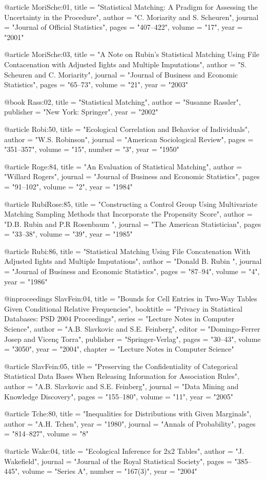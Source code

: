 @article{ MoriSche:01,
	title = "Statistical Matching: A Pradigm for Assessing the Uncertainty in the Procedure",
	author = "C. Moriarity and S. Scheuren",
	journal = "Journal of Official Statistics",
	pages = "407--422",
	volume = "17",
	year = "2001"
}

@article{ MoriSche:03,
	title = "A Note on Rubin’s Statistical Matching Using File Contacenation with Adjusted Iights and Multiple Imputations",
	author = "S. Scheuren and C. Moriarity",
	journal = "Journal of Business and Economic Statistics",
	pages = "65--73",
	volume = "21",
	year = "2003"
}

@book{ Rass:02,
	title = "Statistical Matching",
	author = "Susanne Rassler",
	publisher = "New York: Springer",
	year = "2002"
}

@article{ Robi:50,
	title = "Ecological Correlation and Behavior of Individuals",
	author = "W.S. Robinson",
	journal = "American Sociological Review",
	pages = "351--357",
	volume = "15",
	number = "3",
	year = "1950"
}

@article{ Roge:84,
	title = "An Evaluation of Statistical Matching",
	author = "Willard Rogers",
	journal = "Journal of Business and Economic Statistics",
	pages = "91--102",
	volume = "2",
	year = "1984"
}

@article{ RubiRose:85,
	title = "Constructing a Control Group Using Multivariate Matching Sampling Methods that Incorporate the Propensity Score",
	author = "D.B. Rubin and P.R Rosenbaum ",
	journal = "The American Statistician",
	pages = "33--38",
	volume = "39",
	year = "1985"
}

@article{ Rubi:86,
	title = "Statistical Matching Using File Concatenation With Adjusted Iights and Multiple Imputations",
	author = "{Donald B.} Rubin ",
	journal = "Journal of Business and Economic Statistics",
	pages = "87--94",
	volume = "4",
	year = "1986"
}

@inproceedings{ SlavFein:04,
	title = "Bounds for Cell Entries in Two-Way Tables Given Conditional Relative Frequencies",
	booktitle = "Privacy in Statistical Databases: PSD 2004 Proceedings",
	series = "Lecture Notes in Computer Science",
	author = "A.B. Slavkovic and S.E. Feinberg",
	editor = "Domingo-Ferrer Josep and Vicen\c{c} Torra",
	publisher = "Springer-Verlag",
	pages = "30--43",
	volume = "3050",
	year = "2004",
	chapter = "Lecture Notes in Computer Science"
}

@article{ SlavFein:05,
	title = "Preserving the Confidentiality of Categorical Statistical Data Bases When Releasing Information for Association Rules",
	author = "A.B. Slavkovic and S.E. Feinberg",
	journal = "Data Mining and Knowledge Discovery",
	pages = "155--180",
	volume = "11",
	year = "2005"
}

@article{ Tche:80,
	title = "Inequalities for Distributions with Given Marginals",
	author = "A.H. Tchen",
	year = "1980",
	journal = "Annals of Probability",
	pages = "814--827",
	volume = "8"
}

@article{ Wake:04,
	title = "Ecological Inference for 2x2 Tables",
    author = "J. Wakefield",
	journal = "Journal of the Royal Statistical Society",
	pages = "385--445",
	volume = "Series A",
	number = "167(3)",
	year = "2004"
}
